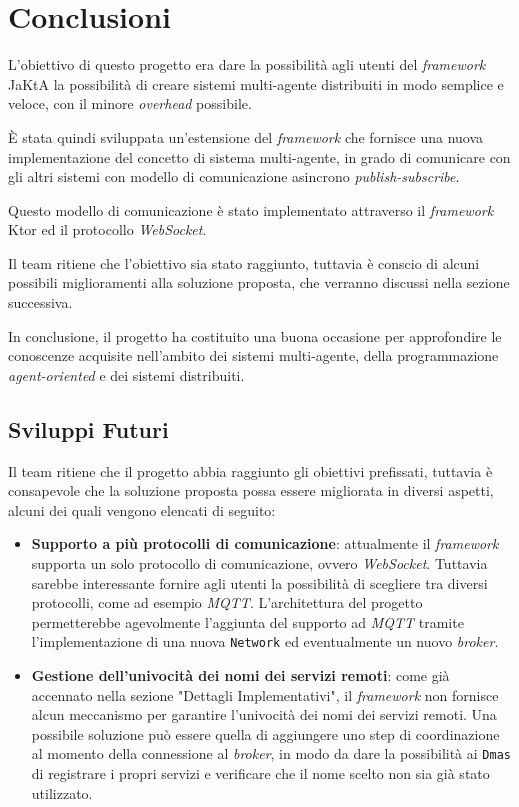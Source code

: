 \section{Conclusioni}
L'obiettivo di questo progetto era dare la possibilità agli utenti del \textit{framework} JaKtA la possibilità di creare sistemi multi-agente distribuiti in modo semplice e veloce, con il minore \textit{overhead} possibile.

È stata quindi sviluppata un'estensione del \textit{framework} che fornisce una nuova implementazione del concetto di sistema multi-agente, in grado di comunicare con gli altri sistemi con modello di comunicazione asincrono \textit{publish-subscribe}.

Questo modello di comunicazione è stato implementato attraverso il \textit{framework} Ktor ed il protocollo \textit{WebSocket}.

Il team ritiene che l'obiettivo sia stato raggiunto, tuttavia è conscio di alcuni possibili miglioramenti alla soluzione proposta, che verranno discussi nella sezione successiva.

In conclusione, il progetto ha costituito una buona occasione per approfondire le conoscenze acquisite nell'ambito dei sistemi multi-agente, della programmazione \textit{agent-oriented} e dei sistemi distribuiti.


\subsection{Sviluppi Futuri}
Il team ritiene che il progetto abbia raggiunto gli obiettivi prefissati, tuttavia è consapevole che la soluzione proposta possa essere migliorata in diversi aspetti, alcuni dei quali vengono elencati di seguito:

\begin{itemize}
    \item \textbf{Supporto a più protocolli di comunicazione}: attualmente il \textit{framework} supporta un solo protocollo di comunicazione, ovvero \textit{WebSocket}. Tuttavia sarebbe interessante
    fornire agli utenti la possibilità di scegliere tra diversi protocolli, come ad esempio \textit{MQTT}. L'architettura del progetto permetterebbe agevolmente l'aggiunta del supporto ad \textit{MQTT}
    tramite l'implementazione di una nuova \texttt{Network} ed eventualmente un nuovo \textit{broker}.
    \item \textbf{Gestione dell'univocità dei nomi dei servizi remoti}: come già accennato nella sezione "Dettagli Implementativi", il \textit{framework} non fornisce alcun meccanismo per garantire
    l'univocità dei nomi dei servizi remoti. Una possibile soluzione può essere quella di aggiungere uno step di coordinazione al momento della connessione al \textit{broker}, in modo da dare la possibilità ai
    \texttt{Dmas} di registrare i propri servizi e verificare che il nome scelto non sia già stato utilizzato.
\end{itemize}
